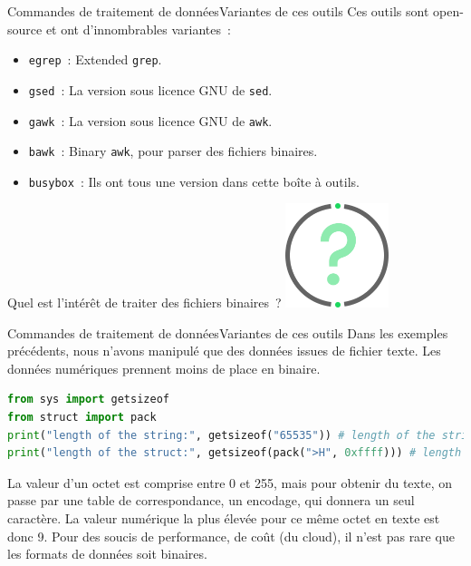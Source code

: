 \documentclass{beamer}
\begin{document}
    \begin{frame}{Commandes de traitement de données}{Variantes de ces outils}
        Ces outils sont open-source et ont d'innombrables variantes~:
        \begin{itemize}
            \item \lstinline{egrep}~: Extended \lstinline{grep}.
            \item \lstinline{gsed}~: La version sous licence GNU de \lstinline{sed}.
            \item \lstinline{gawk}~: La version sous licence GNU de \lstinline{awk}.
            \item \lstinline{bawk}~: Binary \lstinline{awk}, pour parser des fichiers binaires.
            \item \lstinline{busybox}~: Ils ont tous une version dans cette boîte à outils.
        \end{itemize}
        \bigbreak
        Quel est l'intérêt de traiter des fichiers binaires~?
        \bigbreak
        \centering
        \includegraphics[width=3cm]{image/question-mark}
    \end{frame}

    \begin{frame}[fragile]{Commandes de traitement de données}{Variantes de ces outils}
        Dans les exemples précédents, nous n'avons manipulé que des données issues de fichier texte.
        Les données numériques prennent moins de place en binaire.
        \begin{lstlisting}[language=python]
from sys import getsizeof
from struct import pack
print("length of the string:", getsizeof("65535")) # length of the string: 46
print("length of the struct:", getsizeof(pack(">H", 0xffff))) # length of the struct: 35
        \end{lstlisting}
        La valeur d'un octet est comprise entre 0 et 255, mais pour obtenir du texte, on passe par une table de correspondance, un encodage, qui donnera un seul caractère.
        La valeur numérique la plus élevée pour ce même octet en texte est donc 9.
        \bigbreak
        Pour des soucis de performance, de coût (du cloud), il n'est pas rare que les formats de données soit binaires.
    \end{frame}
\end{document}
